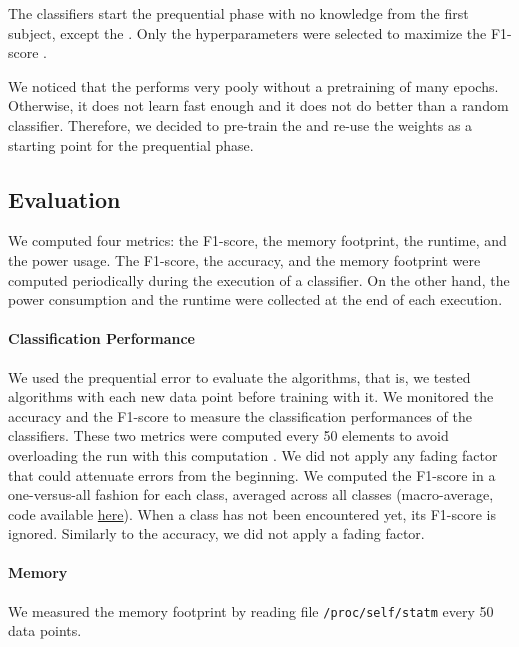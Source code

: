 The
classifiers start the prequential phase with no
knowledge from the first subject, except the \FNN {}. Only the
hyperparameters were selected to maximize the
F1-score .

We noticed that the
\FNN performs very pooly without a
pretraining of many epochs. Otherwise, it 
does not learn fast enough and it does not do better than a
random classifier. Therefore, we decided to
pre-train the \FNN and re-use
the weights as a starting point for the
prequential phase.

\subsection{Evaluation}
We computed four metrics: the F1-score, the memory
footprint, the runtime, and the power usage.
The F1-score, the accuracy, and the memory
footprint were computed periodically during the
execution of a classifier. On the other hand, the
power consumption and the runtime were collected
at the end of each execution.

\paragraph{Classification Performance}
We used the prequential error to evaluate the
algorithms, that is, we tested algorithms with
each new data point before training with it.  We
monitored the accuracy and the F1-score to measure
the classification performances of the
classifiers. These two metrics were computed every
50
elements to avoid overloading the run with this computation . We
did not apply any fading factor that could attenuate errors from the
beginning.
We computed the
F1-score in a one-versus-all fashion for each class, averaged across all classes
(macro-average, code available \href{https://github.com/azazel7/paper-benchmark/blob/9adb1039c5a65a00a66d554f0e870d14d3fff7cb/main.cpp\#L82}{here}).  When a class has not been encountered yet, its F1-score is ignored.
Similarly to the accuracy, we did not apply a fading factor.

\paragraph{Memory}
We measured the memory footprint by reading file
\texttt{/proc/self/statm} every 50 data points.

